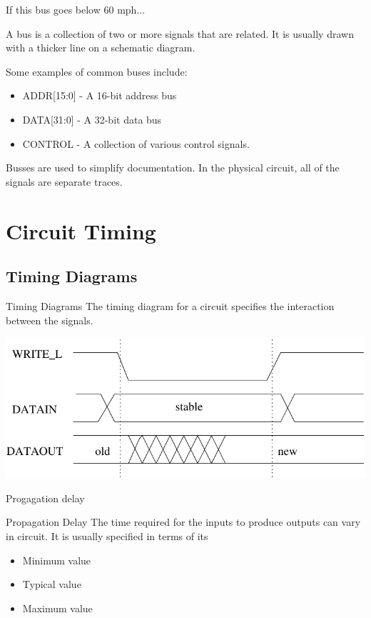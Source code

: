 \begin{frame}{If this bus goes below 60 mph...}
  \begin{definition}
    A \alert{bus} is a collection of two or more signals that are related.  It is usually drawn with a thicker line on a schematic diagram.
  \end{definition}
  Some examples of common buses include:
  \begin{itemize}
    \item ADDR[15:0] - A 16-bit address bus
    \item DATA[31:0] - A 32-bit data bus
    \item CONTROL - A collection of various control signals.
  \end{itemize}
  Busses are used to simplify documentation.  In the physical circuit, all of the signals are separate traces.
\end{frame}

\section{Circuit Timing}

\subsection{Timing Diagrams}

\begin{frame}{Timing Diagrams}
  The timing diagram for a circuit specifies the interaction between the signals.\\
  \begin{center}
    \includegraphics[scale=0.7]{TimingDiagram}
  \end{center}
\end{frame}

\begin{frame}{Progagation delay}
  \begin{block}{Propagation Delay}
    The time required for the inputs to produce outputs can vary in circuit.  It is usually specified in terms of its
    \begin{itemize}
      \item Minimum value
      \item Typical value
      \item Maximum value
    \end{itemize}
  \end{block}
\end{frame}


